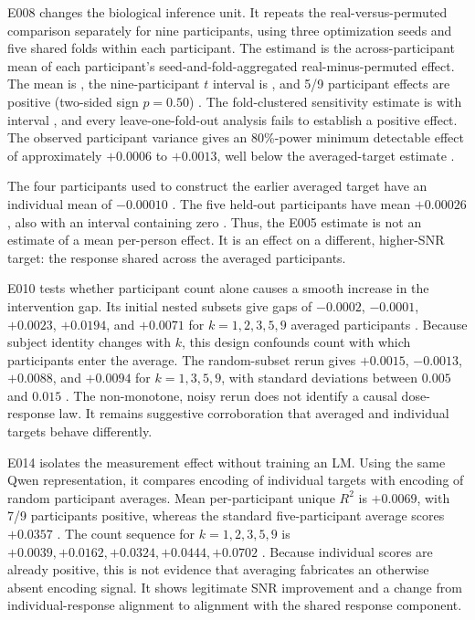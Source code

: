 E008 changes the biological inference unit.
It repeats the real-versus-permuted comparison separately for nine participants, using three optimization seeds and five shared folds within each participant.
The estimand is the across-participant mean of each participant's seed-and-fold-aggregated real-minus-permuted effect.
The mean is , the nine-participant $t$ interval is , and 5/9 participant effects are positive (two-sided sign $p=0.50$) .
The fold-clustered sensitivity estimate is  with interval , and every leave-one-fold-out analysis fails to establish a positive effect.
The observed participant variance gives an 80\%-power minimum detectable effect of approximately $+0.0006$ to $+0.0013$, well below the averaged-target estimate .

The four participants used to construct the earlier averaged target have an individual mean of $-0.00010$ .
The five held-out participants have mean $+0.00026$, also with an interval containing zero .
Thus, the E005 estimate is not an estimate of a mean per-person effect.
It is an effect on a different, higher-SNR target: the response shared across the averaged participants.

E010 tests whether participant count alone causes a smooth increase in the intervention gap.
Its initial nested subsets give gaps of $-0.0002$, $-0.0001$, $+0.0023$, $+0.0194$, and $+0.0071$ for $k=1,2,3,5,9$ averaged participants .
Because subject identity changes with $k$, this design confounds count with which participants enter the average.
The random-subset rerun gives $+0.0015$, $-0.0013$, $+0.0088$, and $+0.0094$ for $k=1,3,5,9$, with standard deviations between $0.005$ and $0.015$ .
The non-monotone, noisy rerun does not identify a causal dose-response law.
It remains suggestive corroboration that averaged and individual targets behave differently.

E014 isolates the measurement effect without training an LM.
Using the same Qwen representation, it compares encoding of individual targets with encoding of random participant averages.
Mean per-participant unique $R^2$ is $+0.0069$, with 7/9 participants positive, whereas the standard five-participant average scores $+0.0357$ .
The count sequence for $k=1,2,3,5,9$ is $+0.0039,+0.0162,+0.0324,+0.0444,+0.0702$ .
Because individual scores are already positive, this is not evidence that averaging fabricates an otherwise absent encoding signal.
It shows legitimate SNR improvement and a change from individual-response alignment to alignment with the shared response component.

